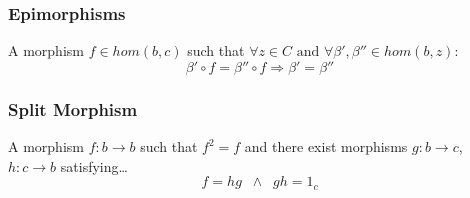 \subsubsection{Epimorphisms}\label{epimorphism}
A morphism $f \in hom(b,c)$ such that $\forall z \in C \textrm{ and } \forall \beta',\beta'' \in hom(b,z)$:
$$\beta'\circ f = \beta''\circ f \Rightarrow \beta'=\beta''$$

\subsubsection{Split Morphism}\label{splitmorphism}
A morphism $f : b \rightarrow b$ such that $f^2 = f$ and there exist morphisms $g:b \rightarrow c$, $h: c \rightarrow b$ satisfying\dots
$$f=hg \; \; \land \; \; gh=1_c$$